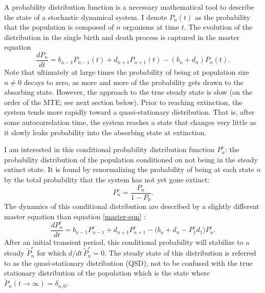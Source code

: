A probability distribution function is a necessary mathematical tool to describe the state of a stochastic dynamical system.
I denote $P_n(t)$ as the probability that the population is composed of $n$ organisms at time $t$.
The evolution of the distribution in the single birth and death process is captured in the master equation \cite{Nisbet1982,Gardiner2004a}
\begin{equation}
\frac{dP_n}{dt} =  b_{n-1}P_{n-1}(t) + d_{n+1}P_{n+1}(t) - (b_n+d_n)P_n(t).
\label{master-eqn}
\end{equation}
Note that ultimately at large times the probability of being at population size $n\neq 0$ decays to zero, as more and more of the probability gets drawn to the absorbing state. 
However, the approach to the true steady state is slow (on the order of the MTE; see next section below). 
Prior to reaching extinction, the system tends more rapidly toward a quasi-stationary distribution. 
That is, after some autocorrelation time, the system reaches a state that changes very little as it slowly leaks probability into the absorbing state at extinction. 

I am interested in this conditional probability distribution function $P_n^c$: the probability distribution of the population conditioned on not being in the steady extinct state. 
It is found by renormalizing the probability of being at each state $n$ by the total probability that the system has not yet gone extinct:
\begin{equation*}
 P_n^c = \frac{P_n}{1-P_0}.
\end{equation*}
The dynamics of this conditional distribution are described by a slightly different master equation than equation \ref{master-eqn} \cite{Nisbet1982}:
\begin{equation}
\frac{dP_n^c}{dt} =  b_{n-1}P_{n-1}^c + d_{n+1}P_{n+1}^c - \big(b_n + d_n - P_1^c d_1 \big) P_n^c. 
\label{masters2}
\end{equation}
After an initial transient period, this conditional probability will stabilize to a steady $\tilde{P}^c_n$ for which $d/dt\,\tilde{P}_n^c=0$. 
The steady state of this distribution is referred to as the quasi-stationary distribution (QSD), not to be confused with the true stationary distribution of the population which is the state where $\tilde{P}_n(t\rightarrow\infty)=\delta_{n,0}$. 

